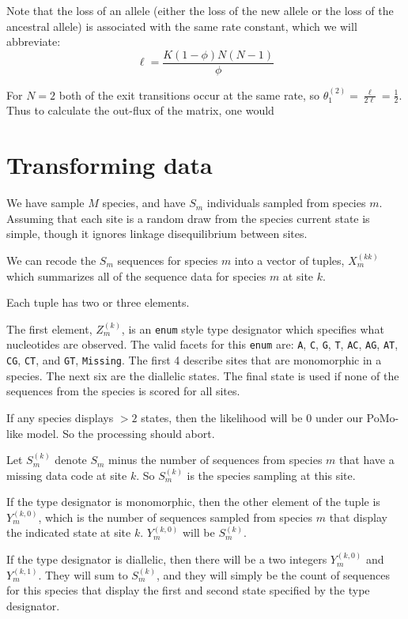 \documentclass{llncs}
\newcommand{\polyProb}{\ensuremath{\phi}}
\newcommand{\Knorm}{\ensuremath{K}}
\newcommand{\pomo}{PoMo\xspace}
\begin{document}
Note that the loss of an allele (either the loss of the new allele or the 
    loss of the ancestral allele) is associated with the same rate constant, which we will
    abbreviate:
    $$\ell = \frac{\Knorm (1-\polyProb)N(N-1)}{\polyProb }$$

For $N=2$ both of the exit transitions occur at the same rate, so $\theta_1^{(2)} = \frac{\ell}{2\ell} = \frac{1}{2}$.
Thus to calculate the out-flux of the matrix, one would 

\section{Transforming data}
We have sample $M$ species, and have $S_m$ individuals sampled from species $m$.
Assuming that each site is a random draw from the species current state is simple, though it ignores
    linkage disequilibrium between sites.

We can recode the $S_m$ sequences for species $m$ into a vector of tuples, $X_m^{(kk)}$ which 
    summarizes all of the sequence data for species $m$ at site $k$.

Each tuple has two or three elements.

The first element, $Z_m^{(k)}$, is an {\tt enum} style type designator which specifies what nucleotides are observed.
The valid facets for this {\tt enum} are: \texttt{A}, \texttt{C}, \texttt{G}, \texttt{T}, \texttt{AC}, \texttt{AG}, \texttt{AT}, \texttt{CG}, \texttt{CT}, and \texttt{GT}, \texttt{Missing}.
The first 4 describe sites that are monomorphic in a species.
The next six are the diallelic states.
The final state is used if none of the sequences from the species is scored for all sites.

If any species displays $>2$ states, then the likelihood will be 0 under our \pomo-like model.
So the processing should abort.

Let $S_m^{(k)}$ denote $S_m$ minus the number of sequences from species $m$ that have a missing data code at site $k$. 
So $S_m^{(k)}$ is the species sampling at this site.

If the type designator is monomorphic, then the other element of the tuple is $Y_m^{(k,0)}$, which is the number of sequences sampled from species $m$ that display the indicated state at site $k$.
$Y_m^{(k,0)}$ will be $S_m^{(k)}$.


If the type designator is diallelic, then there will be a two integers $Y_m^{(k,0)}$ and $Y_m^{(k,1)}$.
They will sum to $S_m^{(k)}$, and they will simply be the count of sequences for this species that display the first and second state specified by the type designator.
\end{document}
